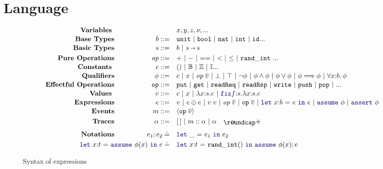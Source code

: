 \section{Language}
\label{sec:formal}

\begin{figure}[th!]
  \vspace{-.3cm}
{\footnotesize
  \begin{alignat*}{2}
    \text{\textbf{Variables }}& \quad &\quad& x, y, z, \vnu, ...
    \\[-0.2em]\text{\textbf{Base Types}}& \quad & b  ::= \quad &  \Code{unit} ~|~ \Code{bool} ~|~ \Code{nat} ~|~ \Code{int} ~|~ \Code{id} ...
    \\[-0.2em]\text{\textbf{Basic Types}}& \quad & s  ::= \quad &  b ~|~ s\sarr s
    \\\text{\textbf{Pure Operations}}& \quad & \primop ::= \quad & {+} ~|~ {-} ~|~ {==} ~|~ {<} ~|~ {\leq} ~|~ \Code{rand\_int}~...
    \\[-0.2em]\text{\textbf{Constants }}& \quad &c ::= \quad & () ~|~ \mathbb{B} ~|~ \mathbb{Z} ~|~ \mathbb{I}...
    \\[-0.2em]\text{\textbf{Qualifiers}}& \quad & \phi ::= \quad & c ~|~ x ~|~ \primop\;\overline{v} ~|~ \bot ~|~ \top  ~|~ \neg \phi ~|~ \phi \land \phi ~|~ \phi \lor \phi ~|~ \phi \impl \phi ~|~ \forall x{:}b.\, \phi
    \\[-0.2em]\text{\textbf{Effectful Operations}}& \quad & \eff{op} ::= \quad & \eff{put} ~|~ \eff{get} ~|~ \eff{readReq} ~|~ \eff{readRsp} ~|~ \eff{write} ~|~ \eff{push} ~|~ \eff{pop} ~|~ ...
    \\[-0.2em]\text{\textbf{Values }}& \quad & v ::= \quad & c ~|~ x
    ~|~ \zlam{x}{s}{e} ~|~ \zfix{f}{s}{x}{s}{e}
    \\[-0.2em]\text{\textbf{Expressions}}& \quad & e ::=\quad & v ~|~
    e \oplus e ~|~ v\; v ~|~ \primop\; \overline{v} ~|~ \eff{op}\;
    \overline{v} ~|~\zlet{x{:}b}{e}{e} ~|~ \sassume{\phi} ~|~
    \sassert{\phi}
    \\[-0.2em]\text{\textbf{Events}} & \quad & m ::= \quad &
    \langle\eff{op}{\; \overline{v}}\rangle \\
    \text{\textbf{Traces}} & \quad & \alpha ::= \quad & \emptr ~|~ m
    \;{::}\; \alpha ~|~ \alpha \listconcat \alpha
    \\[4pt]
    \text{\textbf{Notations}} & \quad & e_1;e_2 \doteq \quad &
    \zlet{\_}{e_1}{e_2}  \\
    & & \hspace{-2.5cm}\zlet{x{:}t}{\sassume{\phi(x)}}{e} \doteq \quad &
    \zlet{x{:}t}{\Code{rand\_int ()}}{\sassume{\phi(x)}; e}
  \end{alignat*}
}
\vspace*{-.2in}
\caption{Syntax of \DSL{} expressions}
\label{fig:term-syntax}
\vspace*{-.1in}
\end{figure}

